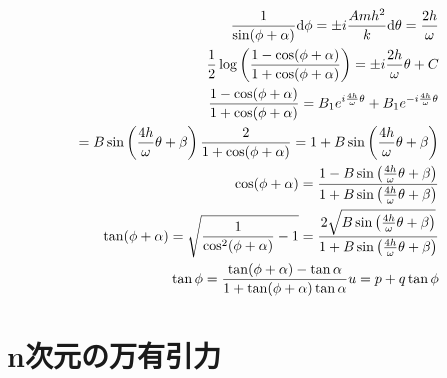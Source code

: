 	\begin{align*}
		\frac{1}{\sin(\phi + \alpha)}\mathrm{d}\phi = \pm i\frac{Amh^2}{k}\mathrm{d}\theta = \frac{2h}{\omega}\\
		\frac{1}{2}\log\left(\frac{1 - \cos(\phi + \alpha)}{1 + \cos(\phi + \alpha)} \right) = \pm i\frac{2h}{\omega}\theta + C\\
		\frac{1 - \cos(\phi + \alpha)}{1 + \cos(\phi + \alpha)} = B_1e^{i\frac{4h}{\omega}\theta} + B_1e^{-i\frac{4h}{\omega}\theta}\\
		= B\sin\left(\frac{4h}{\omega}\theta + \beta \right)
		\frac{2}{1 + \cos(\phi + \alpha)} = 1 + B\sin\left(\frac{4h}{\omega}\theta + \beta \right)\\
		\cos(\phi + \alpha) = \frac{1 - B\sin\left(\frac{4h}{\omega}\theta + \beta \right)}{1 + B\sin\left(\frac{4h}{\omega}\theta + \beta \right)}\\
		\tan(\phi + \alpha) = \sqrt{\frac{1}{\cos^2(\phi + \alpha)} - 1} = \frac{2\sqrt{B\sin\left(\frac{4h}{\omega}\theta + \beta \right)}}{1 + B\sin\left(\frac{4h}{\omega}\theta + \beta \right)}\\
		\tan\phi = \frac{\tan(\phi + \alpha) - \tan\alpha}{1 + \tan(\phi + \alpha)\tan\alpha}
		u = p + q\tan\phi
	\end{align*}

\section{n次元の万有引力}
